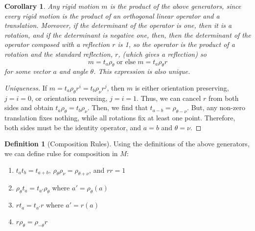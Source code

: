 \documentclass[12pt]{article}
\newtheorem{cor}[thm]{Corollary}
\theoremstyle{definition}
\newtheorem{defn}[thm]{Definition}
\theoremstyle{remark}
\numberwithin{equation}{section}
\begin{document}
\vspace{15pt}

\begin{cor}
        Any rigid motion $m$ is the product of the above generators, since every rigid motion is the product of an orthogonal linear operator and a translation. Moreover, if the determinant of the operator is one, then it is a rotation, and if the determinant is negative one, then, then the determinant of the operator composed with a reflection $r$ is 1, so the operator is the product of a rotation and the standard reflection, $r$, (which gives a reflection) so \begin{equation}
                m = t_a\rho_{\theta}\;\text{or else}\;m=t_a\rho_{\theta}r
        \end{equation}
        for some vector $a$ and angle $\theta$. This expression is also unique.
\end{cor}
\begin{proof}
        [Uniqueness] If $m = t_a\rho_{\theta}r^i = t_b\rho_{\nu}r^j$, then $m$ is either orientation preserving, $j=i = 0$, or orientation reversing, $j = i =1$. Thus, we can cancel $r$ from both sides and obtain $t_a\rho_{\theta} = t_b\rho_{\nu}$. Then, we find that $t_{a-b} = \rho_{\theta-\nu}$. But, any non-zero translation fixes nothing, while all rotations fix at least one point. Therefore, both sides must be the identity operator, and $a=b$ and $\theta = \nu$.
\end{proof}


\vspace{15pt}

\begin{defn}[Composition Rules]
        Using the definitions of the above generators, we can define rulse for composition in $M$:\begin{enumerate}
                \item $t_{a}t_{b} = t_{a+b}$, $\rho_{\theta}\rho_{\nu} = \rho_{\theta+\nu}$, and $rr = 1$
                \item $\rho_{\theta}t_{a} = t_{a'}\rho_{\theta}$ where $a' = \rho_{\theta}(a)$
                \item $rt_a = t_{a'}r$ where $a' = r(a)$
                \item $r\rho_{\theta} = \rho_{-\theta}r$
        \end{enumerate}
\end{defn}

\vspace{15pt}
\end{document}
